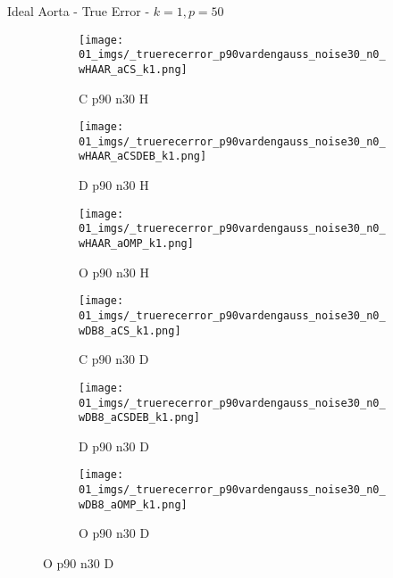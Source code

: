 \begin{frame}{Ideal Aorta - True Error - $k=1,p=50$}{}
\begin{figure}
\begin{subfigure}{0.13\textwidth}
\texttt{[image: 01\_imgs/\_truerecerror\_p90vardengauss\_noise30\_n0\_wHAAR\_aCS\_k1.png]}
\caption*{\tiny C p90 n30 H}
\end{subfigure}
\begin{subfigure}{0.13\textwidth}
\texttt{[image: 01\_imgs/\_truerecerror\_p90vardengauss\_noise30\_n0\_wHAAR\_aCSDEB\_k1.png]}
\caption*{\tiny D p90 n30 H}
\end{subfigure}
\begin{subfigure}{0.13\textwidth}
\texttt{[image: 01\_imgs/\_truerecerror\_p90vardengauss\_noise30\_n0\_wHAAR\_aOMP\_k1.png]}
\caption*{\tiny O p90 n30 H}
\end{subfigure}
\begin{subfigure}{0.13\textwidth}
\texttt{[image: 01\_imgs/\_truerecerror\_p90vardengauss\_noise30\_n0\_wDB8\_aCS\_k1.png]}
\caption*{\tiny C p90 n30 D}
\end{subfigure}
\begin{subfigure}{0.13\textwidth}
\texttt{[image: 01\_imgs/\_truerecerror\_p90vardengauss\_noise30\_n0\_wDB8\_aCSDEB\_k1.png]}
\caption*{\tiny D p90 n30 D}
\end{subfigure}
\begin{subfigure}{0.13\textwidth}
\texttt{[image: 01\_imgs/\_truerecerror\_p90vardengauss\_noise30\_n0\_wDB8\_aOMP\_k1.png]}
\caption*{\tiny O p90 n30 D}
\end{subfigure}
\end{figure}
\end{frame}



